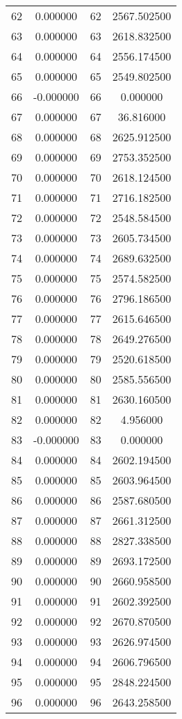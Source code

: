 \documentclass[12pt]{article}
\begin{document}
\begin{longtable}{@{}cccc@{}}
62 & 0.000000 & 62 & 2567.502500 \\
63 & 0.000000 & 63 & 2618.832500 \\
64 & 0.000000 & 64 & 2556.174500 \\
65 & 0.000000 & 65 & 2549.802500 \\
66 & -0.000000 & 66 & 0.000000 \\
67 & 0.000000 & 67 & 36.816000 \\
68 & 0.000000 & 68 & 2625.912500 \\
69 & 0.000000 & 69 & 2753.352500 \\
70 & 0.000000 & 70 & 2618.124500 \\
71 & 0.000000 & 71 & 2716.182500 \\
72 & 0.000000 & 72 & 2548.584500 \\
73 & 0.000000 & 73 & 2605.734500 \\
74 & 0.000000 & 74 & 2689.632500 \\
75 & 0.000000 & 75 & 2574.582500 \\
76 & 0.000000 & 76 & 2796.186500 \\
77 & 0.000000 & 77 & 2615.646500 \\
78 & 0.000000 & 78 & 2649.276500 \\
79 & 0.000000 & 79 & 2520.618500 \\
80 & 0.000000 & 80 & 2585.556500 \\
81 & 0.000000 & 81 & 2630.160500 \\
82 & 0.000000 & 82 & 4.956000 \\
83 & -0.000000 & 83 & 0.000000 \\
84 & 0.000000 & 84 & 2602.194500 \\
85 & 0.000000 & 85 & 2603.964500 \\
86 & 0.000000 & 86 & 2587.680500 \\
87 & 0.000000 & 87 & 2661.312500 \\
88 & 0.000000 & 88 & 2827.338500 \\
89 & 0.000000 & 89 & 2693.172500 \\
90 & 0.000000 & 90 & 2660.958500 \\
91 & 0.000000 & 91 & 2602.392500 \\
92 & 0.000000 & 92 & 2670.870500 \\
93 & 0.000000 & 93 & 2626.974500 \\
94 & 0.000000 & 94 & 2606.796500 \\
95 & 0.000000 & 95 & 2848.224500 \\
96 & 0.000000 & 96 & 2643.258500 \\

\end{longtable}
\end{document}
